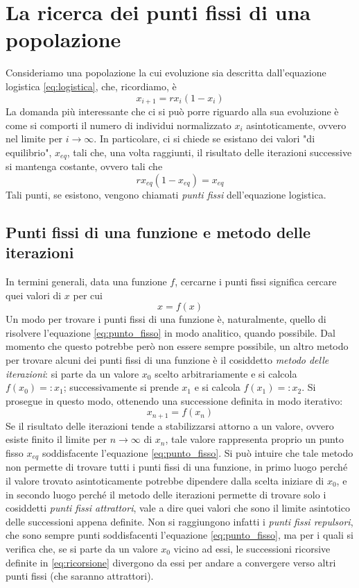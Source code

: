 \section{La ricerca dei punti fissi di una popolazione}
Consideriamo una popolazione la cui evoluzione sia descritta dall'equazione logistica \ref{eq:logistica}, che, ricordiamo, è $$ x_{i+1} = r x_i (1-x_i)$$ La domanda più interessante che ci si può porre riguardo alla sua evoluzione è come si comporti il numero di individui normalizzato $x_i$ asintoticamente, ovvero nel limite per $i\rightarrow \infty$. In particolare, ci si chiede se esistano dei valori "di equilibrio", $x_{eq}$, tali che, una volta raggiunti, il risultato delle iterazioni successive si mantenga costante, ovvero tali che $$r x_{eq} (1-x_{eq}) = x_{eq}$$
Tali punti, se esistono, vengono chiamati \textit{punti fissi} dell'equazione logistica.

\subsection{Punti fissi di una funzione e metodo delle iterazioni}
In termini generali, data una funzione $f$,  cercarne i punti fissi significa cercare quei valori di $x$ per cui 
\begin{equation}
    x = f(x)
    \label{eq:punto_fisso}
\end{equation}
Un modo per trovare i punti fissi di una funzione è, naturalmente, quello di risolvere l'equazione \ref{eq:punto_fisso} in modo analitico, quando possibile. Dal momento che questo potrebbe però non essere sempre possibile, un altro metodo per trovare alcuni dei punti fissi di una funzione è il cosiddetto \textit{metodo delle iterazioni}: si parte da un valore $x_0$ scelto arbitrariamente e si calcola $f(x_0) =: x_1$; successivamente si prende $x_1$ e si calcola $f(x_1) =: x_2$. Si prosegue in questo modo, ottenendo una successione definita in modo iterativo:
\begin{equation}
    x_{n+1} = f(x_n)
    \label{eq:ricorsione}
\end{equation}
Se il risultato delle iterazioni tende a stabilizzarsi attorno a un valore, ovvero esiste finito il limite per $n \rightarrow \infty$ di $x_n$, tale valore rappresenta proprio un punto fisso $x_{eq}$ soddisfacente l'equazione \ref{eq:punto_fisso}. Si può intuire che tale metodo non permette di trovare tutti i punti fissi di una funzione, in primo luogo perché il valore trovato asintoticamente potrebbe dipendere dalla scelta iniziare di $x_0$, e in secondo luogo perché il metodo delle iterazioni permette di trovare solo i cosiddetti \textit{punti fissi attrattori}, vale a dire quei valori che sono il limite asintotico delle successioni appena definite. Non si raggiungono infatti i \textit{punti fissi repulsori}, che sono sempre punti soddisfacenti l'equazione \ref{eq:punto_fisso}, ma per i quali si verifica che, se si parte da un valore $x_0$ vicino ad essi, le successioni ricorsive definite in \ref{eq:ricorsione} divergono da essi per andare a convergere verso altri punti fissi (che saranno attrattori). 

